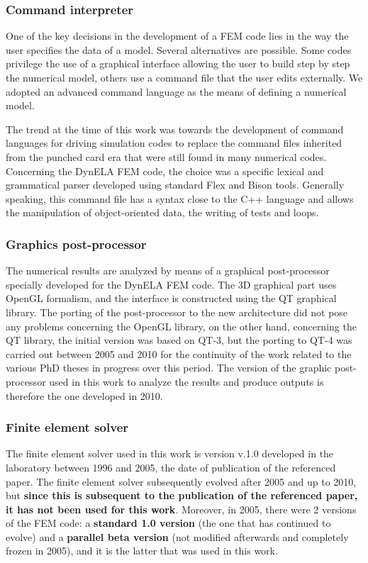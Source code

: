 \subsubsection{Command interpreter}
One of the key decisions in the development of a FEM code lies in the way the user specifies the data of a model. Several alternatives are possible. Some codes privilege the use of a graphical interface allowing the user to build step by step the numerical model, others use a command file that the user edits externally. We adopted an advanced command language as the means of defining a numerical model. 

The trend at the time of this work was towards the development of command languages for driving simulation codes to replace the command files inherited from the punched card era that were still found in many numerical codes. Concerning the DynELA FEM code, the choice was a specific lexical and grammatical parser developed using standard Flex and Bison tools. Generally speaking, this command file has a syntax close to the C++ language and allows the manipulation of object-oriented data, the writing of tests and loops. 
 
\subsubsection{Graphics post-processor}

The numerical results are analyzed by means of a graphical post-processor specially developed for the DynELA FEM code. The 3D graphical part uses OpenGL formalism, and the interface is constructed using the QT graphical library. The porting of the post-processor to the new architecture did not pose any problems concerning the OpenGL library, on the other hand, concerning the QT library, the initial version was based on QT-3, but the porting to QT-4 was carried out between 2005 and 2010 for the continuity of the work related to the various PhD theses in progress over this period. The version of the graphic post-processor used in this work to analyze the results and produce outputs is therefore the one developed in 2010.

\subsubsection{Finite element solver}

The finite element solver used in this work is version v.1.0 developed in the laboratory between 1996 and 2005, the date of publication of the referenced paper. The finite element solver subsequently evolved after 2005 and up to 2010, but \textbf{since this is subsequent to the publication of the referenced paper, it has not been used for this work}. Moreover, in 2005, there were 2 versions of the FEM code: a \textbf{standard 1.0 version} (the one that has continued to evolve) and a \textbf{parallel beta version} (not modified afterwards and completely frozen in 2005), and it is the latter that was used in this work.

